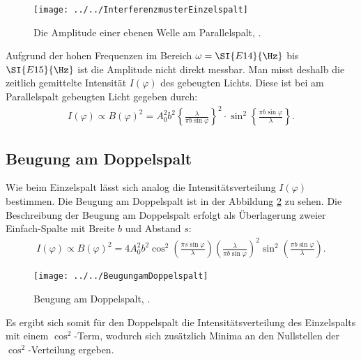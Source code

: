 \begin{figure}[h!]
	\centering
	\texttt{[image: ../../InterferenzmusterEinzelspalt]}
	\caption{Die Amplitude einer ebenen Welle am Parallelspalt, \cite[4]{anleitung406}.}
	\label{fig:interferenzmustereinzelspalt}
\end{figure}

Aufgrund der hohen Frequenzen im Bereich $\omega = \SI{E14}{\Hz}$ bis $\SI{E15}{\Hz}$ ist die Amplitude nicht direkt messbar. Man misst deshalb die zeitlich gemittelte Intensität $I(\varphi)$ des gebeugten Lichts. Diese ist bei am Parallelspalt gebeugten Licht gegeben durch:
\begin{align}
I(\varphi) \propto B(\varphi)^2 = A_0^2 b^2 \left\{\frac{\lambda}{\pi b\sin\varphi}\right\}^2\cdot\sin^2\left\{\frac{\pi b\sin\varphi}{\lambda}\right\}\text{.} \label{eq5}
\end{align}

\subsection{Beugung am Doppelspalt}
Wie beim Einzelspalt lässt sich analog die Intensitätsverteilung $I(\varphi)$ bestimmen. Die Beugung am Doppelspalt ist in der Abbildung \ref{fig:beugungamdoppelspalt} zu sehen. Die Beschreibung der Beugung am Doppelspalt erfolgt als Überlagerung zweier Einfach-Spalte mit Breite $b$ und Abstand $s$:
\begin{align}
I(\varphi) \propto B(\varphi)^2 = 4 A_{0}^{2} b^{2}\cos^2\left(\frac{\pi s\sin\varphi}{\lambda}\right)\left(\frac{\lambda}{\pi b \sin\varphi}\right)^2\sin^2\left(\frac{\pi b\sin\varphi}{\lambda}\right)\text{.}
\end{align}
\begin{figure}[h!]
	\centering
	\texttt{[image: ../../BeugungamDoppelspalt]}
	\caption{Beugung am Doppelspalt, \cite[4]{anleitung406}.}
	\label{fig:beugungamdoppelspalt}
\end{figure}
Es ergibt sich somit für den Doppelspalt die Intensitätsverteilung des Einzelspalts mit einem $\cos^2$-Term, wodurch sich zusätzlich Minima an den Nullstellen der $\cos^2$-Verteilung ergeben. 

